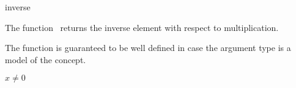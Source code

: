 \begin{ccRefFunction}{inverse}

\ccDefinition

The function \ccRefName\ returns the inverse element with respect to multiplication.

The function is guaranteed to be well defined in case the argument type 
is a model of the  concept. 


{\ccPrecond $x \neq 0$}



\ccSeeAlso

\\
\\

\end{ccRefFunction}
